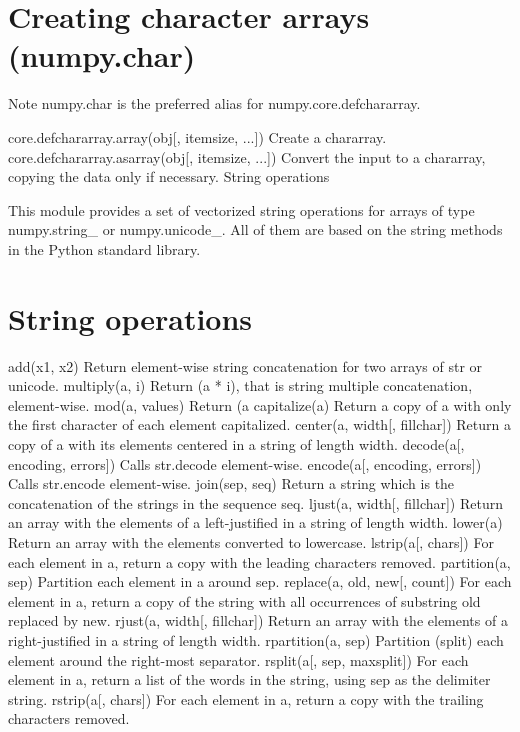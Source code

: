 \section*{Creating character arrays (numpy.char)}
Note
numpy.char is the preferred alias for numpy.core.defchararray.

core.defchararray.array(obj[, itemsize, ...])	Create a chararray.
core.defchararray.asarray(obj[, itemsize, ...])	Convert the input to a chararray, copying the data only if necessary.
String operations

This module provides a set of vectorized string operations for arrays of type numpy.string_ or numpy.unicode_. All of them are based on the string methods in the Python standard library.

\newpage
\section*{String operations}

add(x1, x2)	Return element-wise string concatenation for two arrays of str or unicode.
multiply(a, i)	Return (a * i), that is string multiple concatenation, element-wise.
mod(a, values)	Return (a %
capitalize(a)	Return a copy of a with only the first character of each element capitalized.
center(a, width[, fillchar])	Return a copy of a with its elements centered in a string of length width.
decode(a[, encoding, errors])	Calls str.decode element-wise.
encode(a[, encoding, errors])	Calls str.encode element-wise.
join(sep, seq)	Return a string which is the concatenation of the strings in the sequence seq.
ljust(a, width[, fillchar])	Return an array with the elements of a left-justified in a string of length width.
lower(a)	Return an array with the elements converted to lowercase.
lstrip(a[, chars])	For each element in a, return a copy with the leading characters removed.
partition(a, sep)	Partition each element in a around sep.
replace(a, old, new[, count])	For each element in a, return a copy of the string with all occurrences of substring old replaced by new.
rjust(a, width[, fillchar])	Return an array with the elements of a right-justified in a string of length width.
rpartition(a, sep)	Partition (split) each element around the right-most separator.
rsplit(a[, sep, maxsplit])	For each element in a, return a list of the words in the string, using sep as the delimiter string.
rstrip(a[, chars])	For each element in a, return a copy with the trailing characters removed.

